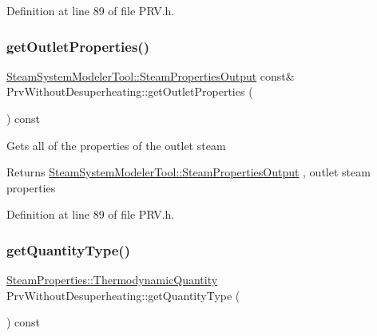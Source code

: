 Definition at line 89 of file P\+R\+V.\+h.

\mbox{\label{class_prv_without_desuperheating_afcf1f5d7e6b18643ac8adc9023578147}} 
\subsubsection{\texorpdfstring{get\+Outlet\+Properties()}{getOutletProperties()}\hspace{0.1cm}{\footnotesize\ttfamily [3/3]}}
{\footnotesize\ttfamily \hyperlink{struct_steam_system_modeler_tool_1_1_steam_properties_output}{Steam\+System\+Modeler\+Tool\+::\+Steam\+Properties\+Output} const\& Prv\+Without\+Desuperheating\+::get\+Outlet\+Properties (\begin{DoxyParamCaption}{ }\end{DoxyParamCaption}) const\hspace{0.3cm}{\ttfamily [inline]}}

Gets all of the properties of the outlet steam \begin{DoxyReturn}{Returns}
\hyperlink{struct_steam_system_modeler_tool_1_1_steam_properties_output}{Steam\+System\+Modeler\+Tool\+::\+Steam\+Properties\+Output} , outlet steam properties 
\end{DoxyReturn}


Definition at line 89 of file P\+R\+V.\+h.

\mbox{\label{class_prv_without_desuperheating_ad465c855f0c7271110ed2cb2ebccf081}} 
\subsubsection{\texorpdfstring{get\+Quantity\+Type()}{getQuantityType()}\hspace{0.1cm}{\footnotesize\ttfamily [1/3]}}
{\footnotesize\ttfamily \hyperlink{class_steam_properties_ae0294bedf7d178c2d8fb6aed0f62fbff}{Steam\+Properties\+::\+Thermodynamic\+Quantity} Prv\+Without\+Desuperheating\+::get\+Quantity\+Type (\begin{DoxyParamCaption}{ }\end{DoxyParamCaption}) const\hspace{0.3cm}{\ttfamily [inline]}}

